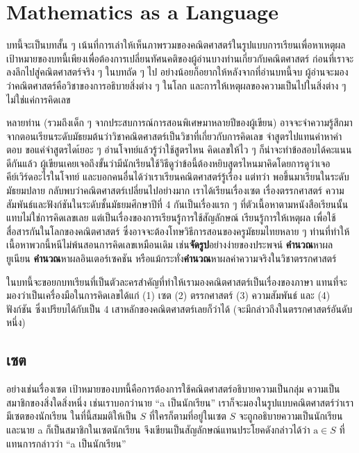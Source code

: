 \chapter{Mathematics as a Language}\label{chap:mathLang}

บทนี้จะเป็นบทสั้น ๆ เน้นที่การเล่าให้เห็นภาพรวมของคณิตศาสตร์ในรูปแบบการเรียนเพื่อหาเหตุผล เป้าหมายของบทนี้เพียงเพื่อต้องการเปลี่ยนทัศนคติของผู้อ่านบางท่านเกี่ยวกับคณิตศาสตร์ ก่อนที่เราจะลงลึกไปสู่คณิตศาสตร์จริง ๆ ในบทถัด ๆ ไป อย่างน้อยก็อยากให้หลังจากที่อ่านบทนี้จบ ผู้อ่านจะมองว่าคณิตศาสตร์คือวิชาของการอธิบายสิ่งต่าง ๆ ในโลก และการให้เหตุผลของความเป็นไปในสิ่งต่าง ๆ ไม่ใช่แค่การคิดเลข

หลายท่าน (รวมถึงเด็ก ๆ จากประสบการณ์การสอนพิเศษมาหลายปีของผู้เขียน) อาจจะจำความรู้สึกมาจากตอนเรียนระดับมัธยมต้นว่าวิชาคณิตศาสตร์เป็นวิชาที่เกี่ยวกับการคิดเลข จำสูตรไปแทนค่าหาคำตอบ ขอแค่จำสูตรไดเ้ยอะ ๆ อ่านโจทย์แล้วรู้ว่าใช้สูตรไหน คิดเลขให้ไว ๆ ก็น่าจะทำข้อสอบได้คะแนนดีกันแล้ว ผู้เขียนเคยเจอถึงขั้นว่ามีนักเรียนใช้วิธีดูว่าข้อนี้ต้องหยิบสูตรไหนมาคิดโดยการดูว่าเจอคีย์เวิร์ดอะไรในโจทย์ และบอกคนอื่นได้ว่าเราเรียนคณิตศาสตร์รู้เรื่อง แต่ทว่า พอขึ้นมาเรียนในระดับมัธยมปลาย กลับพบว่าคณิตศาสตร์เปลี่ยนไปอย่างมาก เราได้เรียนเรื่องเซต เรื่องตรรกศาสตร์ ความสัมพันธ์และฟังก์ชันในระดับชั้นมัธยมศึกษาปีที่ 4 กันเป็นเรื่องแรก ๆ ที่ตัวเนื้อหาตามหนังสือเรียนนั้น แทบไม่ใช่การคิดเลขเลย แต่เป็นเรื่องของการเรียนรู้การใช้สัญลักษณ์ เรียนรู้การให้เหตุผล เพื่อใช้สื่อสารกันในโลกของคณิตศาสตร์ ซึ่งอาจจะต้องโทษวิธีการสอนของครูมัธยมไทยหลาย ๆ ท่านที่ทำให้เนื้อหาพวกนี้หนีไม่พ้นสอนการคิดเลขเหมือนเดิม เช่น\textbf{จัดรูป}อย่างง่ายของประพจน์ \textbf{คำนวณ}หาผลยูเนียน \textbf{คำนวณ}หาผลอินเตอร์เซคชัน หรือแม้กระทั่ง\textbf{คำนวณ}หาผลค่าความจริงในวิชาตรรกศาสตร์

ในบทนี้จะขอยกบทเรียนที่เป็นตัวละครสำคัญที่ทำให้เรามองคณิตศาสตร์เป็นเรื่องของภาษา แทนที่จะมองว่าเป็นเครื่องมือในการคิดเลขได้แก่ (1) เซต (2) ตรรกศาสตร์ (3) ความสัมพันธ์ และ (4) ฟังก์ชัน ซึ่งเปรียบได้กับเป็น 4 เสาหลักของคณิตศาสตร์เลยก็ว่าได้ (จะมีกล่าวถึงในตรรกศาสตร์อันดับหนึ่ง)

\section{เซต} อย่างเช่นเรื่องเซต เป้าหมายของบทนี้คือการต้องการใช้คณิตศาสตร์อธิบายความเป็นกลุ่ม ความเป็นสมาชิกของสิ่งใดสิ่งหนึ่ง เช่นเราบอกว่านาย ``a เป็นนักเรียน'' เราก็จะมองในรูปแบบคณิตศาสตร์ว่าเรามีเซตของนักเรียน ในที่นี้สมมติให้เป็น $S$ ที่ใครก็ตามที่อยู่ในเซต $S$ จะถูกอธิบายความเป็นนักเรียน และนาย a ก็เป็นสมาชิกในเซตนักเรียน จึงเขียนเป็นสัญลักษณ์แทนประโยคดังกล่าวได้ว่า $\text{a} \in S$ ที่แทนการกล่าวว่า ``a เป็นนักเรียน''

